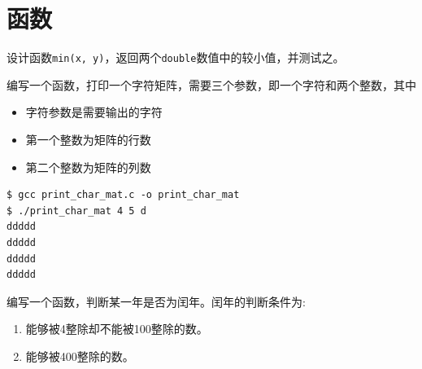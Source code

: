 \section{函数}

\begin{frame}
  \begin{biancheng}
    设计函数\lstinline|min(x, y)|，返回两个\lstinline|double|数值中的较小值，并测试之。
  \end{biancheng}
\end{frame}

\begin{frame}
  
\end{frame}

\begin{frame}
  \begin{biancheng}
    编写一个函数，打印一个字符矩阵，需要三个参数，即一个字符和两个整数，其中
    \begin{itemize}
    \item 字符参数是需要输出的字符
    \item 第一个整数为矩阵的行数
    \item 第二个整数为矩阵的列数
    \end{itemize}
  \end{biancheng}
\end{frame}

\begin{frame}
  
\end{frame}

\begin{frame}
\begin{lstlisting}
$ gcc print_char_mat.c -o print_char_mat
$ ./print_char_mat 4 5 d
ddddd
ddddd
ddddd
ddddd
\end{lstlisting}
\end{frame}


\begin{frame}
  \begin{biancheng}
    编写一个函数，判断某一年是否为闰年。闰年的判断条件为:
    \begin{enumerate}
    \item 能够被4整除却不能被100整除的数。
    \item 能够被400整除的数。
    \end{enumerate}
  \end{biancheng}
\end{frame}

